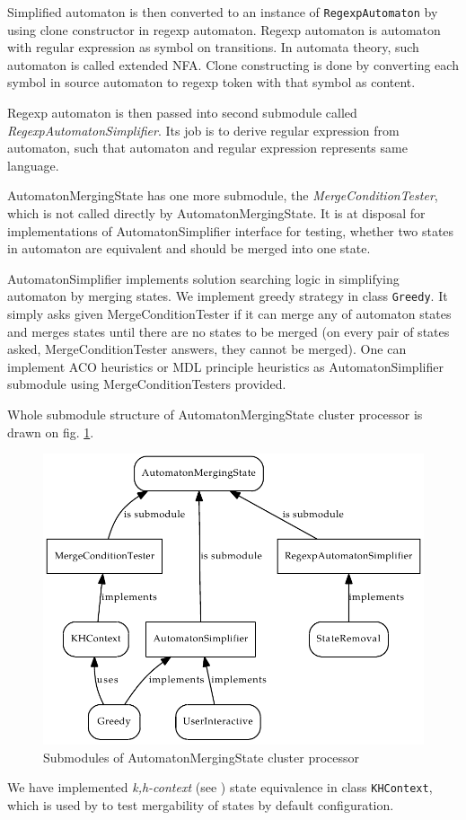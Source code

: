 \documentclass[a4paper,10pt,oneside]{article}
\newcommand{\myscale}{0.74}
\newcommand{\code}[1]{\texttt{#1}}
\newcommand{\jmodule}[1]{\emph{#1}}
\begin{document}
Simplified automaton is then converted to an instance of \code{RegexpAutomaton} by using clone constructor in regexp automaton.
Regexp automaton is automaton with regular expression as symbol on transitions.
In automata theory, such automaton is called extended NFA.
Clone constructing is done by converting each symbol in source automaton to regexp token with that symbol as content.

Regexp automaton is then passed into second submodule called \jmodule{RegexpAutomatonSimplifier}.
Its job is to derive regular expression from automaton, such that automaton and regular expression represents same language.

AutomatonMergingState has one more submodule, the \jmodule{MergeConditionTester}, which is not called directly by AutomatonMergingState.
It is at disposal for implementations of AutomatonSimplifier interface for testing, whether two states in automaton are equivalent and should be merged into one state.

AutomatonSimplifier implements solution searching logic in simplifying automaton by merging states.
We implement greedy strategy in class \code{Greedy}.
It simply asks given MergeConditionTester if it can merge any of automaton states and merges states until there are no states to be merged (on every pair of states asked, MergeConditionTester answers, they cannot be merged).
One can implement ACO heuristics or MDL principle heuristics as AutomatonSimplifier submodule using MergeConditionTesters provided.

Whole submodule structure of AutomatonMergingState cluster processor is drawn on fig. \ref{automaton_merging_state_submodules}.
\begin{figure}
	\centering\includegraphics[scale=\myscale]{automaton_merging_state_submodules}
	\caption{Submodules of AutomatonMergingState cluster processor} \label{automaton_merging_state_submodules}
\end{figure}
We have implemented \emph{k,h-context} (see \cite{ahonen}) state equivalence in class \code{KHContext}, which is used by 
to test mergability of states by default configuration.
\end{document}
